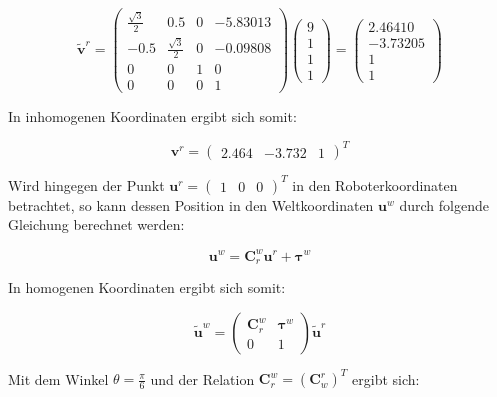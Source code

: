 \documentclass[12pt,a4paper]{report}
\begin{document}
\[
    \tilde{\mathbf{v}}^r = \begin{pmatrix}
        \frac{\sqrt{3}}{2} & 0.5                & 0 & -5.83013 \\
        -0.5               & \frac{\sqrt{3}}{2} & 0 & -0.09808 \\
        0                  & 0                  & 1 & 0        \\
        0                  & 0                  & 0 & 1
    \end{pmatrix}
    \begin{pmatrix}
        9 \\ 1 \\ 1 \\ 1
    \end{pmatrix}
    =
    \begin{pmatrix}
        2.46410 \\ -3.73205 \\ 1 \\ 1
    \end{pmatrix}
\]

In inhomogenen Koordinaten ergibt sich somit:

\[\mathbf{v}^r = \begin{pmatrix} 2.464 & -3.732 & 1 \end{pmatrix}^{T}\]

Wird hingegen der Punkt \(\mathbf{u}^r = \begin{pmatrix} 1 & 0 & 0 \end{pmatrix}^{T}\) in den Roboterkoordinaten betrachtet, so kann dessen Position in den Weltkoordinaten \(\mathbf{u}^w\) durch folgende Gleichung berechnet werden:

\[
    \mathbf{u}^w = \mathbf{C}^w_r\mathbf{u}^r + \boldsymbol{\tau}^w
\]

In homogenen Koordinaten ergibt sich somit:

\[
    \tilde{\mathbf{u}}^w =
    \begin{pmatrix}
        \mathbf{C}^w_r & \boldsymbol{\tau}^w \\
        0              & 1
    \end{pmatrix}
    \tilde{\mathbf{u}}^r
\]

Mit dem Winkel \(\theta = \frac{\pi}{6}\) und der Relation \(\mathbf{C}^w_r = (\mathbf{C}^r_w)^T\) ergibt sich:
\end{document}
